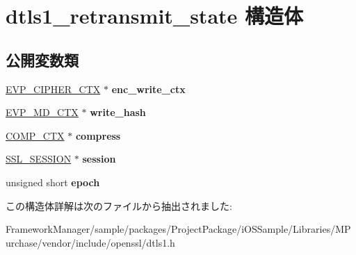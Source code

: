 \hypertarget{structdtls1__retransmit__state}{}\section{dtls1\+\_\+retransmit\+\_\+state 構造体}
\label{structdtls1__retransmit__state}
\subsection*{公開変数類}
\begin{DoxyCompactItemize}
\item 
\hypertarget{structdtls1__retransmit__state_ae1e9d630767c9f03cbbdf719fb84d05f}{}\hyperlink{structevp__cipher__ctx__st}{E\+V\+P\+\_\+\+C\+I\+P\+H\+E\+R\+\_\+\+C\+T\+X} $\ast$ {\bfseries enc\+\_\+write\+\_\+ctx}\label{structdtls1__retransmit__state_ae1e9d630767c9f03cbbdf719fb84d05f}

\item 
\hypertarget{structdtls1__retransmit__state_aabb799421e4698d91594730ac7758f7a}{}\hyperlink{structenv__md__ctx__st}{E\+V\+P\+\_\+\+M\+D\+\_\+\+C\+T\+X} $\ast$ {\bfseries write\+\_\+hash}\label{structdtls1__retransmit__state_aabb799421e4698d91594730ac7758f7a}

\item 
\hypertarget{structdtls1__retransmit__state_a25bba837f21b15d59f3ce572f8255a24}{}\hyperlink{structcomp__ctx__st}{C\+O\+M\+P\+\_\+\+C\+T\+X} $\ast$ {\bfseries compress}\label{structdtls1__retransmit__state_a25bba837f21b15d59f3ce572f8255a24}

\item 
\hypertarget{structdtls1__retransmit__state_ad953293227cf8db42778e560516d160f}{}\hyperlink{structssl__session__st}{S\+S\+L\+\_\+\+S\+E\+S\+S\+I\+O\+N} $\ast$ {\bfseries session}\label{structdtls1__retransmit__state_ad953293227cf8db42778e560516d160f}

\item 
\hypertarget{structdtls1__retransmit__state_a8a8ac3e9aaaeee2fe91f54ad027f17a9}{}unsigned short {\bfseries epoch}\label{structdtls1__retransmit__state_a8a8ac3e9aaaeee2fe91f54ad027f17a9}

\end{DoxyCompactItemize}


この構造体詳解は次のファイルから抽出されました\+:\begin{DoxyCompactItemize}
\item 
Framework\+Manager/sample/packages/\+Project\+Package/i\+O\+S\+Sample/\+Libraries/\+M\+Purchase/vendor/include/openssl/dtls1.\+h\end{DoxyCompactItemize}

